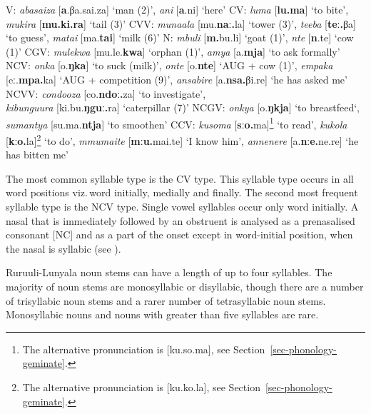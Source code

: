 \ea \label{ex-phono-syllable}
\begin{xlist}
\ex V:  \textit{abasaiza} [\textbf{a}.βa.sai.za] ‘man (2)’,  \textit{ani} [\textbf{a}.ni] `here' \label{ex-phono-syllable-V}
\ex CV:  \textit{luma} [\textbf{lu.ma}] ‘to bite’,  \textit{mukira} [\textbf{mu.ki.ra}] ‘tail (3)’
\ex CVV:  \textit{munaala} [mu.\textbf{naː.}la] ‘tower (3)’,  \textit{teeba} [\textbf{teː.}βa] ‘to guess’,  \textit{matai} [ma.\textbf{tai}] ‘milk (6)’
\ex N:  \textit{mbuli} [\textbf{m.}bu.li] ‘goat (1)’,  \textit{nte} [\textbf{n}.te] ‘cow (1)’\label{ex-phono-syllable-N}
\ex CGV:  \textit{mulekwa} [mu.le.\textbf{kwa}] ‘orphan (1)’,  \textit{amya} [a.\textbf{mja}] ‘to ask formally’
\ex NCV:  \textit{onka} [o.\textbf{ŋka}] ‘to suck (milk)',  \textit{onte} [o.\textbf{nte}] ‘AUG + cow (1)’,  \textit{empaka} [eː.\textbf{mpa.}ka] ‘AUG + competition (9)’,  \textit{ansabire} [a.\textbf{nsa.}βi.re] ‘he has asked me’
\ex NCVV:  \textit{condooza} [co.\textbf{ndoː.}za] `to investigate',\\ \textit{kibunguura}   [ki.bu.\textbf{ŋguː.}ra] `caterpillar (7)'
\ex NCGV:  \textit{onkya} [o.\textbf{ŋkja}] `to breastfeed`,  \textit{sumantya} [su.ma.\textbf{ntja}] `to smoothen'
\ex CCV:  \textit{kusoma} [\textbf{sːo.}ma]\footnote{The alternative pronunciation is [ku.so.ma], see Section~\ref{sec-phonology-geminate}.} `to read',  \textit{kukola} [\textbf{kːo.}la]\footnote{The alternative pronunciation is [ku.ko.la], see Section~\ref{sec-phonology-geminate}.} `to do’,  \textit{mmumaite} [\textbf{mːu.}mai.te] ‘I know him’,  \textit{annenere} [a.\textbf{nːe.}ne.re] ‘he has bitten me’ 
\end{xlist}	
\z

The most common syllable type is the CV type. 
This syllable type occurs in all word positions viz.\,word initially, medially and finally. 
The second most frequent syllable type is the NCV type. 
Single vowel syllables occur only word initially.
A nasal that is immediately followed by an obstruent is analysed as a prenasalised consonant [NC] and as a part of the onset except in word-initial position, when the nasal is syllabic (see \citealt{deBrito2019Tonology}). 

Ruruuli-Lunyala noun stems can have a length of up to four syllables. 
The majority of noun stems are monosyllabic or disyllabic, though there are a number of trisyllabic noun stems and a rarer number of tetrasyllabic noun stems. 
Monosyllabic nouns and nouns with greater than five syllables are rare. 


